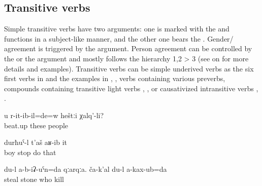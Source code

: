\subsection{Transitive verbs}\label{sec:Transitive verbs}
\largerpage[-1]

Simple transitive verbs have two arguments: one is marked with the  and functions in a subject-like manner, and the other one bears the . Gender/ agreement is triggered by the  argument. Person agreement can be controlled by the  or the  argument and mostly follows the hierarchy 1,2 > 3 (see  on  for more details and examples). Transitive verbs can be simple underived verbs as the six first verbs in  and the examples in , , verbs containing various preverbs, compounds containing transitive light verbs , , or causativized intransitive verbs , . 

\begin{exe}
	\ex	\label{ex:transitive verbs}
	\begin{xlist}
		\ex	{} 
		\ex	{} 
		\ex	{} 
		\ex	{}	
		\ex	{} 
		\ex	{} 
		\ex	{} 
		\ex	{} 
		\ex	{} 	
		\ex	{} 
		\ex	{} 
	\end{xlist}

	\ex	\label{ex:Did these people beat you up}
	\gll	u	r-it-ib-il=de=w	heštːi	χalq'-li?\\
			beat.up	these	people\\
	\glt	{}

	\ex	\label{ex:The boy stopped him}
	\gll	durħuˁ-l	t'aš	aʁ-ib	it\\
		boy	stop	do	that\\
	\glt	{}

	\ex	\label{ex:‎‎I did not steal the stone. I did not kill anyone}
	\gll	du-l	a-b-iʡ-uˁn=da	qːarqːa.	ča-k'al	du-l	a-kax-ub=da\\
		 steal stone	who		kill\\
	\glt	{}
\end{exe}



